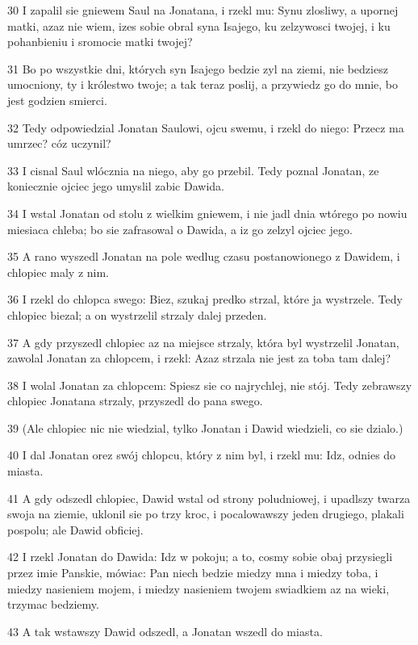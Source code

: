 \par 30 I zapalil sie gniewem Saul na Jonatana, i rzekl mu: Synu zlosliwy, a upornej matki, azaz nie wiem, izes sobie obral syna Isajego, ku zelzywosci twojej, i ku pohanbieniu i sromocie matki twojej?
\par 31 Bo po wszystkie dni, których syn Isajego bedzie zyl na ziemi, nie bedziesz umocniony, ty i królestwo twoje; a tak teraz poslij, a przywiedz go do mnie, bo jest godzien smierci.
\par 32 Tedy odpowiedzial Jonatan Saulowi, ojcu swemu, i rzekl do niego: Przecz ma umrzec? cóz uczynil?
\par 33 I cisnal Saul wlócznia na niego, aby go przebil. Tedy poznal Jonatan, ze koniecznie ojciec jego umyslil zabic Dawida.
\par 34 I wstal Jonatan od stolu z wielkim gniewem, i nie jadl dnia wtórego po nowiu miesiaca chleba; bo sie zafrasowal o Dawida, a iz go zelzyl ojciec jego.
\par 35 A rano wyszedl Jonatan na pole wedlug czasu postanowionego z Dawidem, i chlopiec maly z nim.
\par 36 I rzekl do chlopca swego: Biez, szukaj predko strzal, które ja wystrzele. Tedy chlopiec biezal; a on wystrzelil strzaly dalej przeden.
\par 37 A gdy przyszedl chlopiec az na miejsce strzaly, która byl wystrzelil Jonatan, zawolal Jonatan za chlopcem, i rzekl: Azaz strzala nie jest za toba tam dalej?
\par 38 I wolal Jonatan za chlopcem: Spiesz sie co najrychlej, nie stój. Tedy zebrawszy chlopiec Jonatana strzaly, przyszedl do pana swego.
\par 39 (Ale chlopiec nic nie wiedzial, tylko Jonatan i Dawid wiedzieli, co sie dzialo.)
\par 40 I dal Jonatan orez swój chlopcu, który z nim byl, i rzekl mu: Idz, odnies do miasta.
\par 41 A gdy odszedl chlopiec, Dawid wstal od strony poludniowej, i upadlszy twarza swoja na ziemie, uklonil sie po trzy kroc, i pocalowawszy jeden drugiego, plakali pospolu; ale Dawid obficiej.
\par 42 I rzekl Jonatan do Dawida: Idz w pokoju; a to, cosmy sobie obaj przysiegli przez imie Panskie, mówiac: Pan niech bedzie miedzy mna i miedzy toba, i miedzy nasieniem mojem, i miedzy nasieniem twojem swiadkiem az na wieki, trzymac bedziemy.
\par 43 A tak wstawszy Dawid odszedl, a Jonatan wszedl do miasta.

